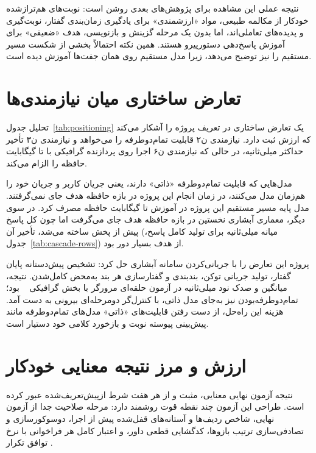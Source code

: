 نتیجه عملی این مشاهده برای پژوهش‌های بعدی روشن است: نوبت‌های
هم‌ترازشده خودکار از مکالمه طبیعی، مواد «ارزشمندی» برای یادگیری
زمان‌بندی گفتار، نوبت‌گیری و پدیده‌های تعاملی‌اند، اما بدون یک مرحله
گزینش و بازنویسی، هدف «ضعیفی» برای آموزش پاسخ‌دهی دستور‌پیرو
هستند. همین نکته احتمالاً بخشی از شکست مسیر مستقیم را نیز توضیح می‌دهد،
زیرا مدل مستقیم روی همان جفت‌ها آموزش دیده است.

\section{تعارض ساختاری میان نیازمندی‌ها}
\label{sec:disc-conflict}

تحلیل جدول~\ref{tab:positioning} یک تعارض ساختاری در تعریف پروژه را آشکار
می‌کند که ارزش ثبت دارد. نیازمندی ن۲ قابلیت تمام‌دوطرفه را می‌خواهد و
نیازمندی ن۳ تأخیر حداکثر  میلی‌ثانیه، در حالی که نیازمندی ن۶
اجرا روی پردازنده گرافیکی با  تا  گیگابایت حافظه را الزام
می‌کند.

مدل‌هایی که قابلیت تمام‌دوطرفه «ذاتی» دارند، یعنی جریان کاربر و جریان
خود را هم‌زمان مدل می‌کنند، در زمان انجام این پروژه در بازه حافظه هدف جای
نمی‌گرفتند. مدل پایه مسیر مستقیم این پروژه در آموزش تا
 گیگابایت حافظه مصرف کرد. در سوی دیگر، معماری آبشاری نخستین در
بازه حافظه هدف جای می‌گرفت اما چون کل پاسخ پیش از پخش ساخته می‌شد، تأخیر آن
(میانه  میلی‌ثانیه برای تولید کامل پاسخ، جدول~\ref{tab:cascade-rows})
از هدف بسیار دور بود.

پروژه این تعارض را با جریانی‌کردن سامانه آبشاری حل کرد: تشخیص پیش‌دستانه
پایان گفتار، تولید جریانی توکن، بندبندی و گفتارسازی هر بند به‌محض کامل‌شدن.
نتیجه، میانگین  و صدک نود  میلی‌ثانیه در آزمون حلقه‌ای مرورگر
با بخش گرافیکی ~ بود؛ تمام‌دوطرفه‌بودن نیز به‌جای مدل ذاتی، با
کنترل‌گر دومرحله‌ای بیرونی به دست آمد. هزینه این راه‌حل، از دست رفتن قابلیت‌های
«ذاتی» مدل‌های تمام‌دوطرفه مانند پیش‌بینی پیوسته نوبت و بازخورد کلامی خود دستیار
است.

\section{ارزش و مرز نتیجه معنایی خودکار}
\label{sec:disc-judge}

نتیجه آزمون نهایی معنایی، مثبت و از هر هفت شرط ازپیش‌تعریف‌شده عبور کرده
است. طراحی این آزمون چند نقطه قوت روشمند دارد: مرحله صلاحیت جدا از آزمون
نهایی، شاخص ردیف‌ها و آستانه‌های قفل‌شده پیش از اجرا، دوسوکورسازی و
تصادفی‌سازی ترتیب بازوها، کدگشایی قطعی داور، و اعتبار کامل هر 
فراخوانی با نرخ توافق تکرار .


